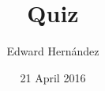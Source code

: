 \documentclass[man,12pt,natbib]{apa6}
\begin{document}
\title{Quiz}
\author{Edward Hern\'{a}ndez}
\date{21 April 2016}
\maketitle

%
\end{document}
